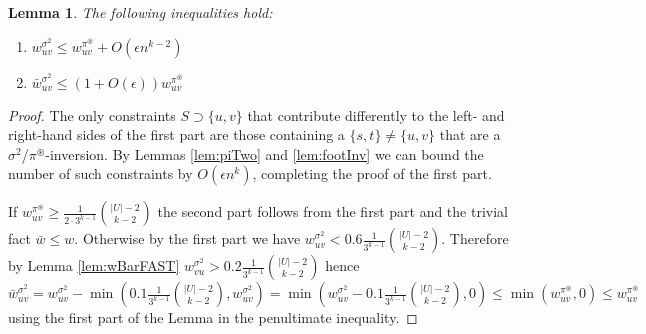 \documentclass[dvips,11pt,letter]{article}
\newcommand{\set}[1]{\{#1\}}                        \newcommand{\setof}[2]{\{\,{#1}\::\:{#2}\,\}}        \newcommand{\groupFrac}[2]{\left(\frac{#1}{#2}\right)}
\newtheorem{lemma}[theorem]{Lemma}
\begin{document}
\begin{lemma}\label{lem:w} The following inequalities hold:
\begin{enumerate}
\item $w_{uv}^{\sigma^2} \le w_{uv}^{\pi^\circledast} + O(\epsilon n^{k-2})$ 
\item $\bar w_{uv}^{\sigma^2} \le (1+O(\epsilon)) w_{uv}^{\pi^\circledast}$
\end{enumerate}
\end{lemma}
\begin{proof}
The only constraints $S \supset \set{u,v}$ that contribute differently to the left- and right-hand sides of the first part are those containing a $\set{s,t} \ne \set{u,v}$ that are a $\sigma^2$/$\pi^\circledast$-inversion. By Lemmas \ref{lem:piTwo} and \ref{lem:footInv} we can bound the number of such constraints by $O(\epsilon n^k)$, completing the proof of the first part.

If $ w_{uv}^{\pi^\circledast} \ge \frac{1}{2 \cdot 3^{k-1}}\binom{|U|-2}{k-2}$ the second part follows from the first part and the trivial fact $\bar w \le w$. Otherwise by the first part we have $w_{uv}^{\sigma^2} < 0.6 \frac{1}{3^{k-1}}\binom{|U|-2}{k-2}$. Therefore by Lemma \ref{lem:wBarFAST} $w_{vu}^{\sigma^2} > 0.2\frac{1}{3^{k-1}}\binom{|U|-2}{k-2}$ hence $\bar w_{uv}^{\sigma^2} = w_{uv}^{\sigma^2} - \min(0.1\frac{1}{3^{k-1}} \binom{|U|-2}{k-2}, w_{uv}^{\sigma^2}) = \min( w_{uv}^{\sigma^2} - 0.1 \frac{1}{3^{k-1}} \binom{|U|-2}{k-2}, 0) \le \min(w_{uv}^{\pi^\circledast}, 0) \le w_{uv}^{\pi^\circledast}$ using the first part of the Lemma in the penultimate inequality.
\end{proof}
\end{document}
